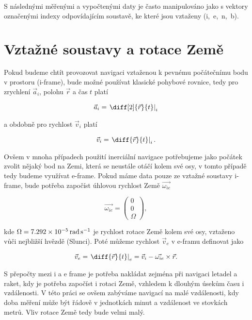 S následnými měřenými a vypočtenými daty je často manipulováno jako s vektory označenými indexy odpovídajícím soustavě, ke které jsou vztaženy (i,~e,~n,~b).

\section{Vztažné soustavy a rotace Země}
Pokud budeme chtít provozovat navigaci vztaženou k pevnému počátečnímu bodu v prostoru (i-frame), bude možné používat klasické pohybové rovnice, tedy pro zrychlení $ \vec{a}_{i} $, polohu $ \vec{r} $ a čas $ t $ platí \cite{Tittertonc2004} 

\begin{equation} \label{eq:aiDiff}
\vec{a}_{i} = \left. \diff[2]{\vec{r}}{t} \right|_{i}
\end{equation}

a obdobně pro rychlost $ \vec{v}_{i} $ platí

\begin{equation}
\vec{v}_{i} = \left. \diff{\vec{r}}{t} \right|_{i} .
\end{equation}

Ovšem v mnoha případech použití inerciální navigace potřebujeme jako počátek zvolit nějaký bod na Zemi, která se neustále otáčí kolem své osy, v tomto případě tedy budeme využívat e-frame. Pokud máme data pouze ze vztažné soustavy i-frame, bude potřeba započíst úhlovou rychlost Země $ \vec{\omega_{ie}} $ \cite{Tittertonc2004} 

\begin{equation}
\vec{\omega_{ie}} = \begin{pmatrix} 0 \\ 0 \\ \Omega \end{pmatrix} ,
\end{equation}

kde $ \Omega = \SI{7,292E-5}{\radian\per\second}$ je rychlost rotace Země kolem své osy, vztaženo vůči nejbližší hvězdě (Slunci). Poté můžeme rychlost $ \vec{v}_{e} $ v e-framu definovat jako \cite{Tittertonc2004} \cite{Grewal2013}

\begin{equation}
\vec{v}_{e} = \left. \diff{\vec{r}}{t} \right|_{e} = \vec{v}_{i} - \vec{\omega_{ie}} \times \vec{r} .
\end{equation}

S přepočty mezi i a e frame je potřeba nakládat zejména při navigaci letadel a raket, kdy je potřeba započíst i rotaci Země, vzhledem k dlouhým úsekům času i vzdálenosti. V této práci se ovšem zabýváme navigací na malé vzdálenosti, kdy doba měření může být řádově v jednotkách minut a vzdálenost ve stovkách metrů. Vliv rotace Země tedy bude velmi malý.

